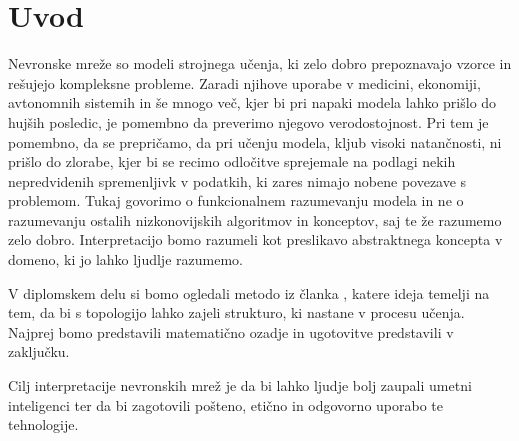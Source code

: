 \chapter{Uvod}
Nevronske mreže so modeli strojnega učenja, ki zelo dobro prepoznavajo vzorce in rešujejo kompleksne probleme. Zaradi njihove uporabe v medicini, ekonomiji, avtonomnih sistemih in še mnogo več, kjer bi pri napaki modela lahko prišlo do hujših posledic, je pomembno da preverimo njegovo verodostojnost. Pri tem je pomembno, da se prepričamo, da pri učenju modela, kljub visoki natančnosti, ni prišlo do zlorabe, kjer bi se recimo odločitve sprejemale na podlagi nekih nepredvidenih spremenljivk v podatkih, ki zares nimajo nobene povezave s problemom. Tukaj govorimo o funkcionalnem razumevanju modela in ne o razumevanju ostalih nizkonovijskih algoritmov in konceptov, saj te že razumemo zelo dobro. Interpretacijo bomo razumeli kot preslikavo abstraktnega koncepta v domeno, ki jo lahko ljudlje razumemo.\cite{MONTAVON20181}

V diplomskem delu si bomo ogledali metodo iz članka \cite{Gabella_2021}, katere ideja temelji na tem, da bi s topologijo lahko zajeli strukturo, ki nastane v procesu učenja. Najprej bomo predstavili matematično ozadje in ugotovitve predstavili v zaključku. 

Cilj interpretacije nevronskih mrež je da bi lahko ljudje bolj zaupali umetni inteligenci ter da bi zagotovili pošteno, etično in odgovorno uporabo te tehnologije.

